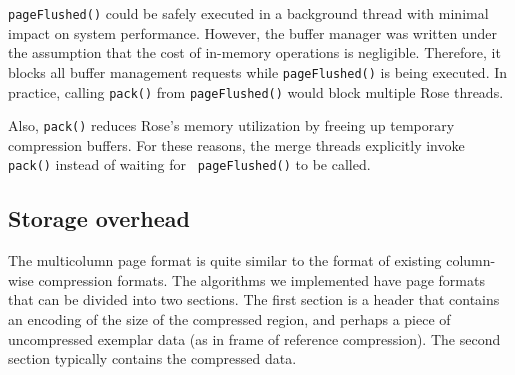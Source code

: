 \documentclass{vldb}
\newcommand{\rows}{Rose\xspace}
\newcommand{\rowss}{Rose's\xspace}
\begin{document}


{\tt pageFlushed()} could be safely executed in a background thread
with minimal impact on system performance.  However, the buffer
manager was written under the assumption that the cost of in-memory
operations is negligible.  Therefore, it blocks all buffer management
requests while {\tt pageFlushed()} is being executed.  In practice,
calling {\tt pack()} from {\tt pageFlushed()} would block multiple
\rows threads.

Also, {\tt pack()} reduces \rowss memory utilization by freeing up
temporary compression buffers.
For these reasons, the merge threads
explicitly invoke {\tt pack()} instead of waiting for {\tt
  pageFlushed()} to be called.


\subsection{Storage overhead}

The multicolumn page format is quite similar to the format of existing
column-wise compression formats.  The algorithms we implemented have
page formats that can be divided into two sections.
The first section is a header that contains an encoding of the size of
the compressed region, and perhaps a piece of uncompressed exemplar
data (as in frame of reference compression).  The second section
typically contains the compressed data.
\end{document}
